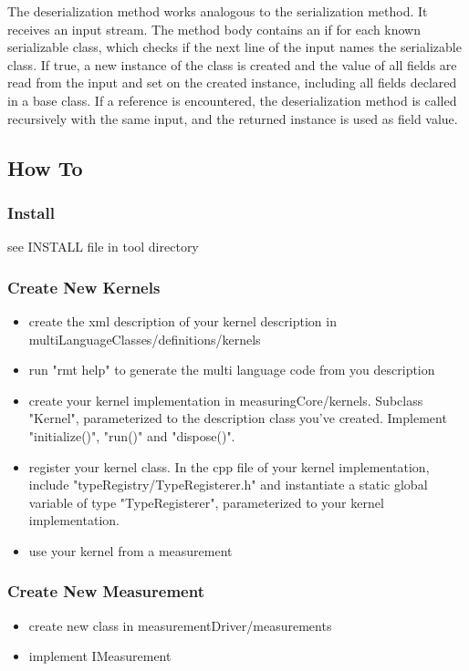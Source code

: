 \documentclass[a4paper,12pt]{article}
\begin{document}
The deserialization method works analogous to the serialization method. It
receives an input stream. The method body contains an if for each known
serializable class, which checks if the next line of the input names  the
serializable class. If true, a new instance of the class is created and the
value of all fields are read from the input and set on the created instance,
including all fields declared in a base class. If a reference is encountered,
the deserialization method is called recursively with the same input, and the
returned instance is used as field value.

\subsection{How To}
\subsubsection{Install}
see INSTALL file in tool directory

\subsubsection{Create New Kernels}
\begin{itemize}
\item create the xml description of your kernel description in
multiLanguageClasses/definitions/kernels
\item run "rmt help" to generate the multi language code from you description
\item create your kernel implementation in measuringCore/kernels. Subclass
"Kernel", parameterized to the description class you've created. Implement
"initialize()", "run()" and "dispose()".
\item register your kernel class. In the cpp file of your kernel implementation,
include "typeRegistry/TypeRegisterer.h" and instantiate a static global variable
of type "TypeRegisterer", parameterized to your kernel implementation.
\item use your kernel from a measurement
\end{itemize}

\subsubsection{Create New Measurement}
\begin{itemize}
\item create new class in measurementDriver/measurements
\item implement IMeasurement
\end{itemize}
\end{document}
